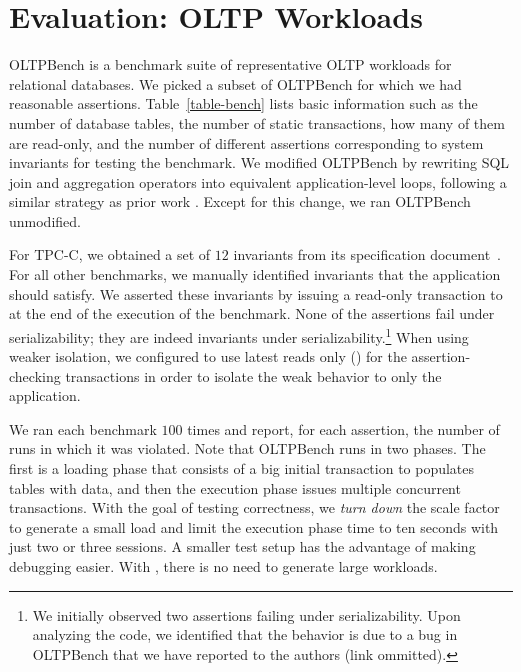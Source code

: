 
\section{Evaluation: OLTP Workloads}
\label{sec:oltp}

OLTPBench \cite{DBLP:journals/pvldb/DifallahPCC13} is a benchmark suite of representative 
OLTP workloads for relational databases.
We picked a subset of OLTPBench for which we had reasonable assertions. 
Table~\ref{table-bench} lists basic
information such as the number of database tables, the
number of static transactions, how many of them are read-only, and the number of
different assertions corresponding to system invariants for testing the benchmark. 
We modified OLTPBench by rewriting SQL join and aggregation
operators 
into equivalent application-level
loops, following a similar strategy as prior work \cite{DBLP:journals/pacmpl/RahmaniNDJ19}. Except for
this change, we ran OLTPBench unmodified. 

For TPC-C, we obtained a set of $12$ invariants from its specification
document~\cite{tpcc-spec}. For all other benchmarks, we manually identified 
invariants that the application should satisfy. We asserted these invariants 
by issuing a read-only transaction to \tool{} 
at the end of the execution of the benchmark. 
None of the assertions fail under serializability; they are indeed invariants
under serializability.\footnote{We initially observed two assertions failing
under serializability. Upon analyzing the code, we identified that the
behavior is due to a bug in OLTPBench that we have reported to the authors (link
ommitted).} 
When using weaker isolation, we configured \tool{} to use latest reads only
() for the assertion-checking transactions 
in order to isolate the weak behavior to only the application. 

We ran each benchmark $100$ times and report, for each assertion, the number of
runs in which it was violated. Note that OLTPBench runs in two phases. The first
is a loading phase that consists of a big initial transaction to populates tables 
with data, and then the execution phase issues multiple concurrent transactions. 
With the goal of testing correctness, we \textit{turn down} the scale factor to
generate a small load and limit the execution phase time to ten seconds with 
just two or three sessions. A smaller test setup has the advantage
of making debugging easier. With \tool{}, there is no need to generate large
workloads.

